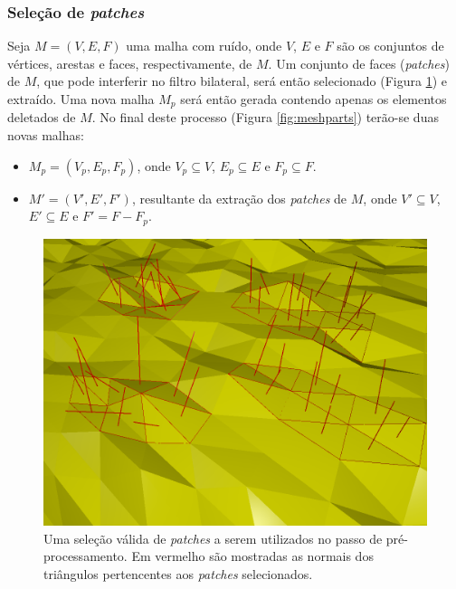 \subsubsection{Seleção de \textit{patches}}

Seja $M = (V,E,F)$ uma malha com ruído, onde $V$, $E$ e $F$ são os conjuntos de vértices, arestas e faces, respectivamente, de $M$. Um conjunto de faces (\textit{patches}) de $M$, que pode interferir no filtro bilateral, será então selecionado (Figura \ref{fig:validselection}) e extraído. Uma nova malha $M_p$ será então gerada contendo apenas os elementos deletados de $M$. No final deste processo (Figura \ref{fig:meshparts}) terão-se duas novas malhas: 

\begin{itemize}  
\item $M_p = (V_p,E_p,F_p)$, onde $V_p \subseteq V$, $E_p \subseteq E$ e $F_p \subseteq F$.
\item $M' = (V', E', F')$, resultante da extração dos \textit{patches} de $M$, onde $V' \subseteq V$, $E' \subseteq E$ e $F' = F - F_p$.
\end{itemize}


\begin{figure}[!h]
\captionsetup{width=\linewidth}
\centering
\includegraphics[scale=0.30]{figuras/validselection.png}
\caption{Uma seleção válida de \textit{patches} a serem utilizados no passo de pré-processamento. Em vermelho são mostradas as normais dos triângulos pertencentes aos \textit{patches} selecionados.}
\label{fig:validselection}
\end{figure}


